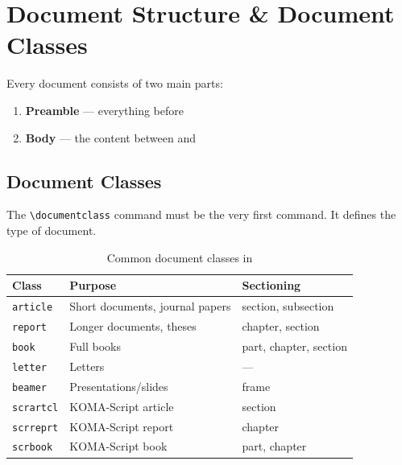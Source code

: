 
\chapter{Document Structure \& Document Classes}

Every \latex{} document consists of two main parts:
\begin{enumerate}
    \item \textbf{Preamble} — everything before \verb||
    \item \textbf{Body} — the content between \verb|| and \verb||
\end{enumerate}

\section{Document Classes}
\label{sec:docclasses}

The \verb|\documentclass| command must be the very first command. It defines the type of document.

\begin{table}[H]
\centering
\begin{tabular}{lll}
\toprule
\textbf{Class} & \textbf{Purpose} & \textbf{Sectioning} \\
\midrule
\texttt{article} & Short documents, journal papers & section, subsection \\
\texttt{report}  & Longer documents, theses        & chapter, section \\
\texttt{book}    & Full books                      & part, chapter, section \\
\texttt{letter}  & Letters                         & — \\
\texttt{beamer}  & Presentations/slides            & frame \\
\texttt{scrartcl} & KOMA-Script article            & section \\
\texttt{scrreprt} & KOMA-Script report             & chapter \\
\texttt{scrbook}  & KOMA-Script book               & part, chapter \\
\bottomrule
\end{tabular}
\caption{Common document classes in \latex{}}
\end{table}

